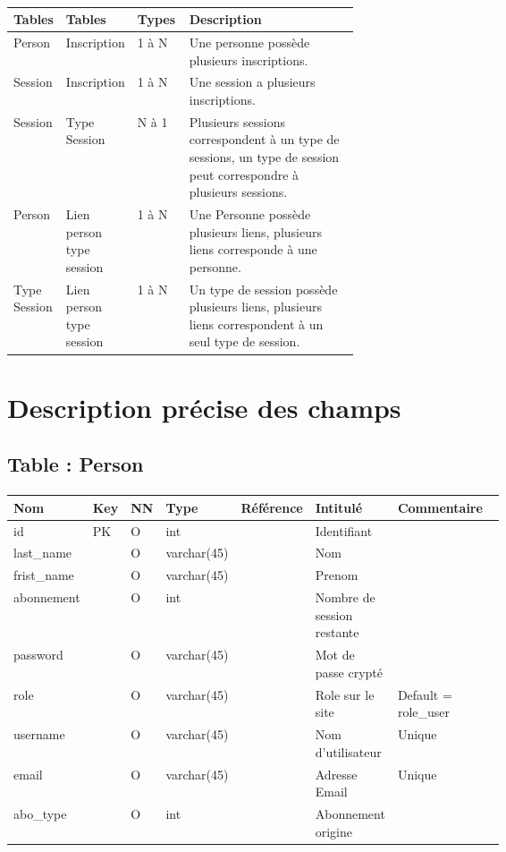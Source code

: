 	\paragraph{}
		\begin{tabularx}{\linewidth}{|T{0.15\linewidth}|T{0.15\linewidth}|T{0.15\linewidth}|Y|}
			\hline
			Tables & Tables & Types & Description\\
			\hline	
			Person & Inscription & 1 à N & Une personne possède plusieurs inscriptions. \\
			\hline
			Session & Inscription & 1 à N & Une session a plusieurs inscriptions. \\
			\hline
			Session & Type Session & N à 1 & Plusieurs sessions correspondent à un type de sessions, un type de session peut correspondre à plusieurs sessions. \\
			\hline
			Person & Lien person type session & 1 à N & Une Personne possède plusieurs liens, plusieurs liens corresponde à une personne. \\
			\hline
			Type Session & Lien person type session & 1 à N & Un type de session possède plusieurs liens, plusieurs liens correspondent à un seul type de session. \\
			\hline
		\end{tabularx}
		
\vspace{\baselineskip}
\section{Description précise des champs}
	\subsection{Table : Person}
		\paragraph{}
			\begin{tabularx}{\linewidth}{|T{0.14\linewidth}|T{0.05\linewidth}|T{0.05\linewidth}|T{0.13\linewidth}|T{0.12\linewidth}|T{0.15\linewidth}|Y|}
				\hline
				Nom & Key & NN & Type & Référence & Intitulé & Commentaire \\
				\hline
				id & PK & O & int & & Identifiant & \\
				\hline
				last\_name & & O & varchar(45) & & Nom & \\
				\hline
				frist\_name & & O & varchar(45) & & Prenom & \\
				\hline
				abonnement & & O & int & & Nombre de session restante & \\
				\hline
				password & & O & varchar(45) & & Mot de passe crypté & \\
				\hline
				role & & O & varchar(45) & & Role sur le site & Default = role\_user \\
				\hline
				username & & O & varchar(45) & & Nom d'utilisateur & Unique \\
				\hline
				email & & O & varchar(45) & & Adresse Email & Unique \\
				\hline
				abo\_type & & O & int & & Abonnement origine & \\
				\hline
			\end{tabularx}
	
